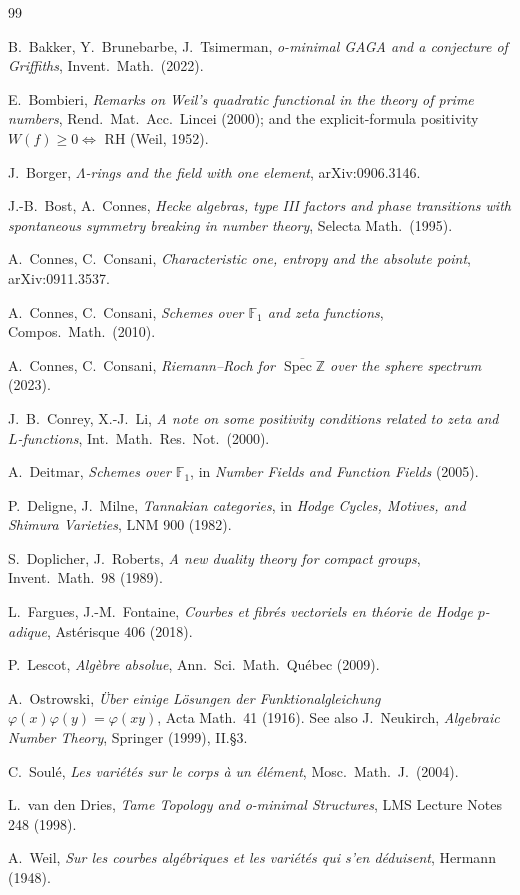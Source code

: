 \documentclass[11pt,reqno]{amsart}
\theoremstyle{plain}
\theoremstyle{definition}
\theoremstyle{remark}
\newcommand{\Z}{\mathbb{Z}}
\newcommand{\F}{\mathbb{F}}
\newcommand{\Spec}{\operatorname{Spec}}
\begin{document}
\begin{thebibliography}{99}

 B.~Bakker, Y.~Brunebarbe, J.~Tsimerman, \emph{o-minimal GAGA and a conjecture of Griffiths},
Invent.\ Math.\ (2022).

 E.~Bombieri, \emph{Remarks on Weil's quadratic functional in the theory of prime numbers},
Rend.\ Mat.\ Acc.\ Lincei (2000); and the explicit-formula positivity $W(f)\geq0\Leftrightarrow$ RH (Weil,
1952).

 J.~Borger, \emph{$\Lambda$-rings and the field with one element}, arXiv:0906.3146.

 J.-B.~Bost, A.~Connes, \emph{Hecke algebras, type III factors and phase transitions with
spontaneous symmetry breaking in number theory}, Selecta Math.\ (1995).

 A.~Connes, C.~Consani, \emph{Characteristic one, entropy and the absolute point},
arXiv:0911.3537.

 A.~Connes, C.~Consani, \emph{Schemes over $\F_1$ and zeta functions},
Compos.\ Math.\ (2010).

 A.~Connes, C.~Consani, \emph{Riemann--Roch for $\overline{\Spec\Z}$ over the sphere
spectrum} (2023).

 J.~B.~Conrey, X.-J.~Li, \emph{A note on some positivity conditions related to zeta and
$L$-functions}, Int.\ Math.\ Res.\ Not.\ (2000).

 A.~Deitmar, \emph{Schemes over $\F_1$}, in \emph{Number Fields and Function Fields}
(2005).

 P.~Deligne, J.~Milne, \emph{Tannakian categories}, in \emph{Hodge Cycles, Motives, and
Shimura Varieties}, LNM 900 (1982).

 S.~Doplicher, J.~Roberts, \emph{A new duality theory for compact groups}, Invent.\ Math.\ 98
(1989).

 L.~Fargues, J.-M.~Fontaine, \emph{Courbes et fibr\'es vectoriels en th\'eorie de
Hodge $p$-adique}, Ast\'erisque 406 (2018).

 P.~Lescot, \emph{Alg\`ebre absolue}, Ann.\ Sci.\ Math.\ Qu\'ebec (2009).

 A.~Ostrowski, \emph{\"Uber einige L\"osungen der Funktionalgleichung
$\varphi(x)\varphi(y)=\varphi(xy)$}, Acta Math.\ 41 (1916). See also J.~Neukirch, \emph{Algebraic Number
Theory}, Springer (1999), II.\S3.

 C.~Soul\'e, \emph{Les vari\'et\'es sur le corps \`a un \'el\'ement}, Mosc.\ Math.\ J.\ (2004).

 L.~van den Dries, \emph{Tame Topology and o-minimal Structures}, LMS Lecture Notes 248 (1998).

 A.~Weil, \emph{Sur les courbes alg\'ebriques et les vari\'et\'es qui s'en d\'eduisent},
Hermann (1948).

\end{thebibliography}
\end{document}
